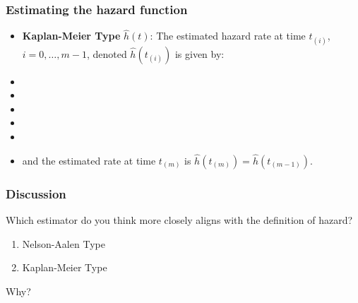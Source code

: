 \begin{frame}
\frametitle{Estimating the hazard function}
\begin{itemize}
\item \textbf{Kaplan-Meier Type} $\hat{h}(t)$: The estimated hazard rate at time $t_{(i)}$, $i =0,\dots,m-1$,
    denoted $\hat{h}(t_{(i)})$ is given by:
   \item[]
   \item[]
   \item[]
   \item[]
   \item[]
   \item[] and the estimated rate at time $t_{(m)}$ is $\hat{h}(t_{(m)})=\hat{h}(t_{(m-1)})$.


\end{itemize}
\end{frame}

\begin{frame}
\frametitle{Discussion}
\begin{clicker}{Which estimator do you think more closely aligns with the definition of hazard?}
\begin{enumerate}
\item Nelson-Aalen Type
\item Kaplan-Meier Type
\end{enumerate}
\end{clicker}
\vskip10pt
Why?
\vskip200pt
\end{frame}



